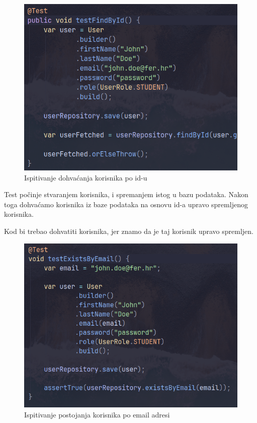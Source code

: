 \begin{figure}[H]
	\includegraphics[scale=0.6]{slike/test_4.png}
	\centering
	\caption{Ispitivanje dohvaćanja korisnika po id-u}
	\label{fig:test_4}
\end{figure}

Test počinje stvaranjem korisnika, i spremanjem istog u bazu podataka. Nakon 
toga dohvaćamo korisnika iz baze podataka na osnovu id-a upravo spremljenog 
korisnika.

Kod bi trebao dohvatiti korisnika, jer znamo da je taj korisnik upravo 
spremljen.

\begin{figure}[H]
	\includegraphics[scale=0.6]{slike/test_5.png}
	\centering
	\caption{Ispitivanje postojanja korisnika po email adresi}
	\label{fig:test_5}
\end{figure}

